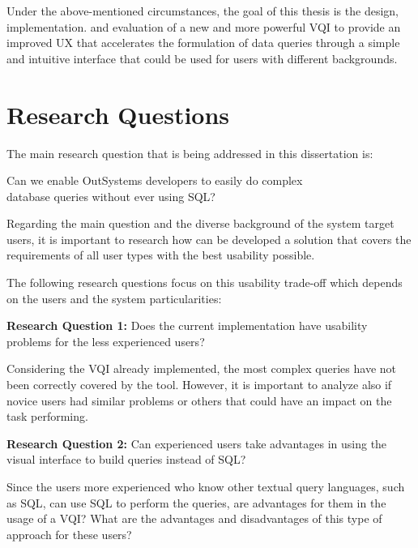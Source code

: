 Under the above-mentioned circumstances, the goal of this thesis is the design, implementation. and evaluation of a new and more powerful \gls{VQI} to provide an improved \gls{UX} that accelerates the formulation of data queries through a simple and intuitive interface that could be used for users with different backgrounds.

\section{Research Questions}
\label{sec:research_questions}
The main research question that is being addressed in this dissertation is: 

\begin{center}
  Can we enable OutSystems developers to easily do complex \\ database queries without ever using \gls{SQL}?
\end{center}

Regarding the main question and the diverse background of the system target users, it is important to research how can be developed a solution that covers the requirements of all user types with the best usability possible.

The following research questions focus on this usability trade-off which depends on the users and the system particularities:

\medskip

\textbf{Research Question 1:} Does the current implementation have usability problems for the less experienced users?

\medskip

Considering the \gls{VQI} already implemented, the most complex queries have not been correctly covered by the tool. However, it is important to analyze also if novice users had similar problems or others that could have an impact on the task performing.

\medskip

\textbf{Research Question 2:} Can experienced users take advantages in using the visual interface to build queries instead of \gls{SQL}?

\medskip

Since the users more experienced who know other textual query languages, such as \gls{SQL}, can use \gls{SQL} to perform the queries, are advantages for them in the usage of a \gls{VQI}? What are the advantages and disadvantages of this type of approach for these users?

